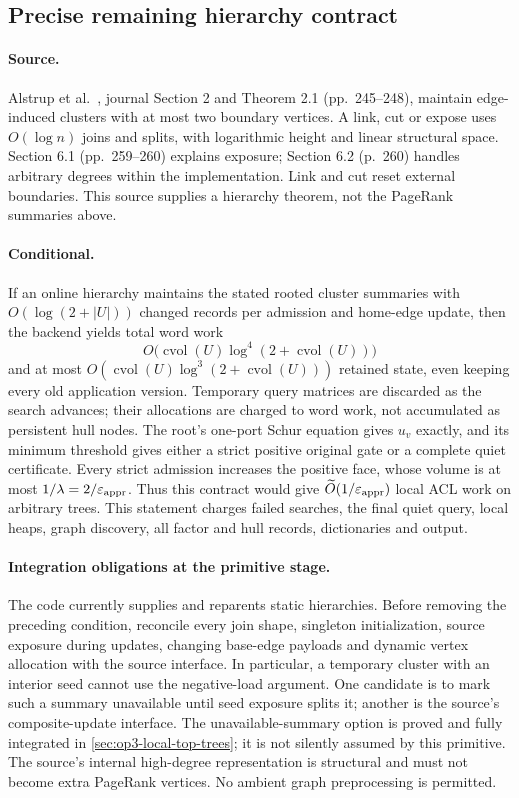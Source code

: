 \subsection{Precise remaining hierarchy contract}

\paragraph{Source.}
Alstrup et al.\ \cite{alstrup2005toptrees}, journal Section 2 and
Theorem 2.1 (pp.\ 245--248), maintain edge-induced clusters with at
most two boundary vertices. A link, cut or expose uses $O(\log n)$ joins and
splits, with logarithmic height and linear structural space. Section 6.1
(pp.\ 259--260) explains exposure; Section 6.2 (p.\ 260) handles arbitrary
degrees within the implementation. Link and cut reset external boundaries.
This source supplies a hierarchy theorem, not the PageRank summaries above.

\paragraph{Conditional.}
If an online hierarchy maintains the stated rooted cluster summaries with
$O(\log(2+|U|))$ changed records per admission and home-edge update, then the
backend yields total word work
\[
 O\bigl(\operatorname{cvol}(U)\log^4(2+\operatorname{cvol}(U))\bigr)
\]
and at most $O(\operatorname{cvol}(U)\log^3(2+\operatorname{cvol}(U)))$
retained state, even keeping every old application version. Temporary
query matrices are discarded as the search advances; their allocations
are charged to word work, not accumulated as persistent hull nodes. The root's one-port
Schur equation gives $u_v$ exactly, and its minimum threshold gives either a
strict positive original gate or a complete quiet certificate. Every strict
admission increases the positive face, whose volume is at most
$1/\lambda=2/\varepsilon_{\mathrm{appr}}$. Thus this contract would give
$\widetilde O(1/\varepsilon_{\mathrm{appr}})$ local ACL work on arbitrary trees. This statement
charges failed searches, the final quiet query, local heaps, graph discovery,
all factor and hull records, dictionaries and output.

\paragraph{Integration obligations at the primitive stage.}
The code currently supplies and reparents static hierarchies. Before removing
the preceding condition, reconcile every join shape, singleton initialization,
source exposure during updates, changing base-edge payloads and dynamic
vertex allocation with the source interface. In particular, a temporary
cluster with an interior seed cannot use the negative-load argument. One
candidate is to mark such a summary unavailable until seed exposure splits
it; another is the source's composite-update interface. The unavailable-summary option is proved and fully integrated in
\cref{sec:op3-local-top-trees}; it is not silently assumed by this primitive. The source's internal high-degree representation is
structural and must not become extra PageRank vertices. No ambient graph
preprocessing is permitted.

